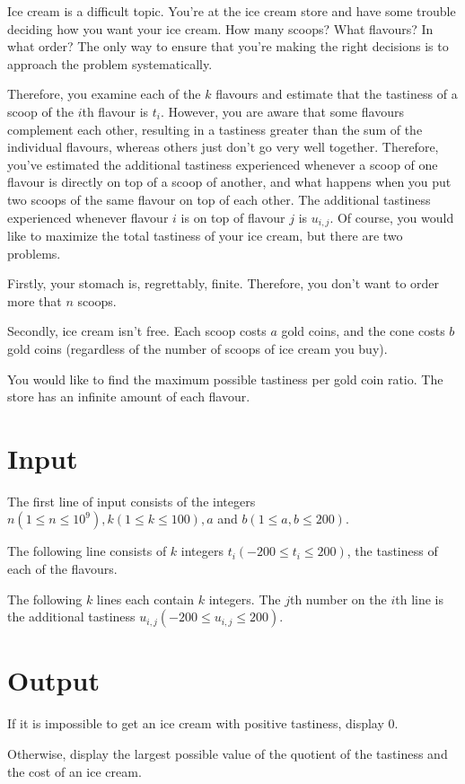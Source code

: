 Ice cream is a difficult topic. You're at the ice cream store and have some trouble deciding how you want your ice cream. How many scoops? What flavours? In what order? The only way to ensure that you're making the right decisions is to approach the problem systematically.

Therefore, you examine each of the $k$ flavours and estimate that the tastiness of a scoop of the $i$th flavour is $t_i$. However, you are aware that some flavours complement each other, resulting in a tastiness greater than the sum of the individual flavours, whereas others just don't go very well together. Therefore, you've estimated the additional tastiness experienced whenever a scoop of one flavour is directly on top of a scoop of another, and what happens when you put two scoops of the same flavour on top of each other. The additional tastiness experienced whenever flavour $i$ is on top of flavour $j$ is $u_{i,j}$.
Of course, you would like to maximize the total tastiness of your ice cream, but there are two problems.

Firstly, your stomach is, regrettably, finite. Therefore, you don't want to order more that $n$ scoops. 

Secondly, ice cream isn't free. Each scoop costs $a$ gold coins, and the cone costs $b$ gold coins (regardless of the number of scoops of ice cream you buy).

You would like to find the maximum possible tastiness per gold coin ratio. The store has an infinite amount of each flavour.

\section*{Input}
The first line of input consists of the integers $n (1 \leq n \leq 10^9), k (1 \leq k \leq 100), a$ and $b (1 \leq a,b \leq 200)$.

The following line consists of $k$ integers $t_i (-200 \leq t_i \leq 200)$, the tastiness of each of the flavours.

The following $k$ lines each contain $k$ integers. The $j$th number on the $i$th line is the additional tastiness $u_{i,j} (-200 \leq u_{i,j} \leq 200)$.

\section*{Output}
If it is impossible to get an ice cream with positive tastiness, display $0$.

Otherwise, display the largest possible value of the quotient of the tastiness and the cost of an ice cream.
